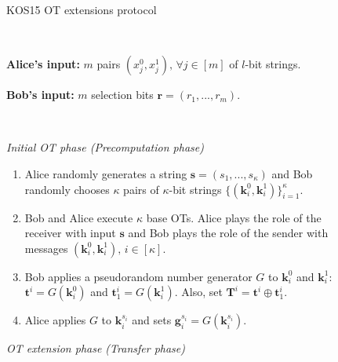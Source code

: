 \begin{figure}
    \centering
        \begin{tcolorbox}
                        
			\centerline{KOS15 OT extensions protocol \citep{KOS15}}
            
			\ 

    \textbf{Alice's input:} $m$ pairs $(x^0_j, x^1_j),\, \forall j\in[m]$ of $l$-bit strings.
    
    \textbf{Bob's input:} $m$ selection bits $\boldsymbol{r} = (r_1, ..., r_m)$.
    
    \
    
    \textit{Initial OT phase (Precomputation phase)}
    \begin{enumerate}
         \item Alice randomly generates a string $\boldsymbol{s} = (s_1, ..., s_\kappa)$ and Bob randomly chooses $\kappa$ pairs of $\kappa$-bit strings $\{(\boldsymbol{k}^0_i, \boldsymbol{k}^1_i)\}^\kappa_{i=1}$.
         \item Bob and Alice execute $\kappa$ base OTs. Alice plays the role of the receiver with input $\boldsymbol{s}$ and Bob plays the role of the sender with messages $(\boldsymbol{k}^0_i, \boldsymbol{k}^1_i),\, i\in[\kappa]$.
         \item Bob applies a pseudorandom number generator $G$ to $\boldsymbol{k}^0_i$ and $\boldsymbol{k}^1_i$: $\boldsymbol{t}^i = G(\boldsymbol{k}^0_i)$ and $\boldsymbol{t}^i_1 = G(\boldsymbol{k}^1_i)$. Also, set $\boldsymbol{T}^i = \boldsymbol{t}^i \oplus \boldsymbol{t}^i_1$.
         \item Alice applies $G$ to $\boldsymbol{k}^{s_i}_i$ and sets $\boldsymbol{g}^{s_i}_i = G(\boldsymbol{k}^{s_i}_i)$.
    \end{enumerate}
    \textit{OT extension phase (Transfer phase)}
    

\end{tcolorbox}
\end{figure}
